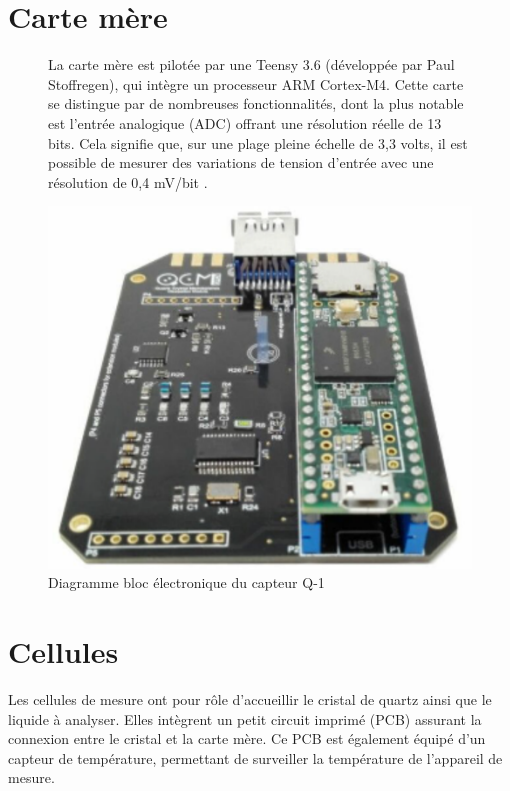 \section{Carte mère}
\begin{figure}[H]
    \centering
    \begin{minipage}{0.48\textwidth}
        \small
        La carte mère est pilotée par une Teensy 3.6 (développée par Paul Stoffregen), 
        qui intègre un processeur ARM Cortex-M4. Cette carte se distingue par de nombreuses fonctionnalités, 
        dont la plus notable est l'entrée analogique (ADC) offrant une résolution réelle de 13 bits. 
        Cela signifie que, sur une plage pleine échelle de 3,3 volts, il est possible de mesurer des variations de tension d’entrée avec une résolution de 0,4 mV/bit \cite{manual-openqcmQ1}.
    \end{minipage}\hfill
    \begin{minipage}{0.48\textwidth}
        \centering
        \includegraphics[width=\textwidth]{assets/figures/Quartz-Crystal-Microbalance-openQCM-Q-1-Shield-Photo.png}
        \caption{Diagramme bloc électronique du capteur Q-1 \cite{manual-openqcmQ1}}
        \label{fig:Main Board Q-1}
    \end{minipage}
\end{figure}

\section{Cellules}
Les cellules de mesure ont pour rôle d’accueillir le cristal de quartz ainsi que le liquide à analyser.
Elles intègrent un petit circuit imprimé (PCB) assurant la connexion entre le cristal et la carte mère.
Ce PCB est également équipé d’un capteur de température, permettant de surveiller la température de l’appareil de mesure.

